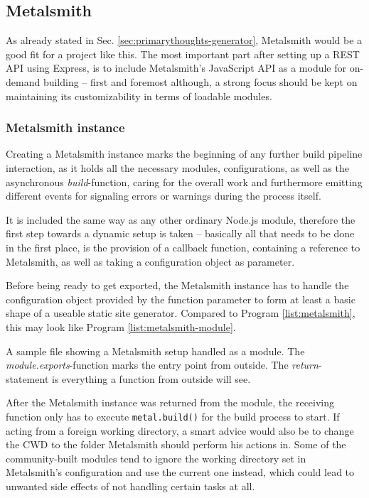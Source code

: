 \subsection{Metalsmith}
\label{sec:foundation-metalsmith}

As already stated in Sec. \ref{sec:primarythoughts-generator}, Metalsmith would be a good fit for a project like this. The most important part after setting up a REST API using Express, is to include Metalsmith's JavaScript API as a module for on-demand building -- first and foremost although, a strong focus should be kept on maintaining its customizability in terms of loadable modules.

\subsubsection{Metalsmith instance}
Creating a Metalsmith instance marks the beginning of any further build pipeline interaction, as it holds all the necessary modules, configurations, as well as the asynchronous \emph{build}-function, caring for the overall work and furthermore emitting different events for signaling errors or warnings during the process itself.

It is included the same way as any other ordinary Node.js module, therefore the first step towards a dynamic setup is taken -- basically all that needs to be done in the first place, is the provision of a callback function, containing a reference to Metalsmith, as well as taking a configuration object as parameter.

Before being ready to get exported, the Metalsmith instance has to handle the configuration object provided by the function parameter to form at least a basic shape of a useable static site generator. Compared to Program \ref{list:metalsmith}, this may look like Program \ref{list:metalsmith-module}.

\begin{program}
  \caption{A sample file showing a Metalsmith setup handled as a module. The \emph{module.exports}-function marks the entry point from outside. The \emph{return}-statement is everything a function from outside will see.}
  \label{list:metalsmith-module}

\end{program}

After the Metalsmith instance was returned from the module, the receiving function only has to execute \texttt{metal.build()} for the build process to start. If acting from a foreign working directory, a smart advice would also be to change the CWD to the folder Metalsmith should perform his actions in. Some of the community-built modules tend to ignore the working directory set in Metalsmith's configuration and use the current one instead, which could lead to unwanted side effects of not handling certain tasks at all.

